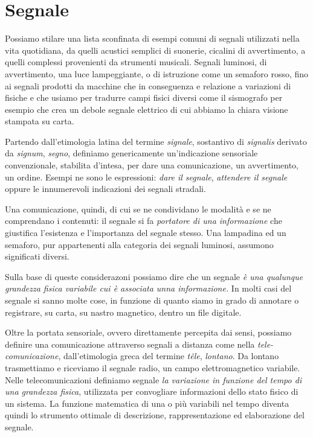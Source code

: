 
\section{Segnale}

Possiamo stilare una lista sconfinata di esempi comuni di segnali utilizzati nella
vita quotidiana, da quelli acustici semplici di suonerie, cicalini di avvertimento,
a quelli complessi provenienti da strumenti musicali. Segnali luminosi, di
avvertimento, una luce lampeggiante, o di istruzione come un semaforo rosso, fino
ai segnali prodotti da macchine che in conseguenza e relazione a variazioni di
fisiche e che usiamo per tradurre campi fisici diversi come il sismografo per
esempio che crea un debole segnale elettrico di cui abbiamo la chiara visione
stampata su carta.

Partendo dall'etimologia latina del termine \emph{signale}, sostantivo di
\emph{signalis} derivato da \emph{signum}, \emph{segno}, definiamo genericamente
un'indicazione sensoriale convenzionale, stabilita d'intesa, per dare una
comunicazione, un avvertimento, un ordine. Esempi ne sono le espressioni:
\emph{dare il segnale}, \emph{attendere il segnale} oppure le innumerevoli
indicazioni dei segnali stradali.

Una comunicazione, quindi, di cui se ne condividano le modalità e se ne
comprendano i contenuti: il segnale si fa \emph{portatore di una informazione}
che giustifica l'esistenza e l'importanza del segnale stesso. Una lampadina ed un
semaforo, pur appartenenti alla categoria dei segnali luminosi, assumono
significati diversi.

Sulla base di queste considerazoni possiamo dire che un segnale \emph{è una
qualunque grandezza fisica variabile cui è associata unna informazione.} In molti
casi del segnale si sanno molte cose, in funzione di quanto siamo in grado di
annotare o registrare, su carta, su nastro magnetico, dentro un file digitale.

Oltre la portata sensoriale, ovvero direttamente percepita dai sensi, possiamo definire
una comunicazione attraverso segnali a distanza come nella \emph{tele-comunicazione},
dall'etimologia greca del termine \emph{têle}, \emph{lontano}. Da lontano
trasmettiamo e riceviamo il segnale radio, un campo elettromagnetico variabile.
Nelle telecomunicazioni definiamo segnale \emph{la variazione in funzione del tempo
di una grandezza fisica}, utilizzata per convogliare informazioni dello stato
fisico di un sistema. La funzione matematica di una o più variabili nel tempo
diventa quindi lo strumento ottimale di descrizione, rappresentazione ed
elaborazione del segnale.

